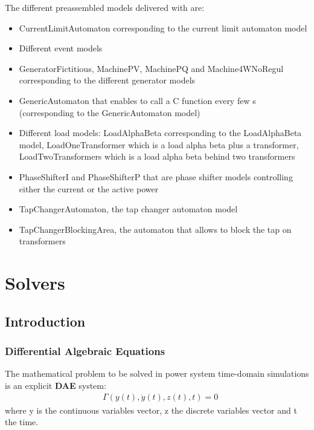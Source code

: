 \documentclass[a4paper, 12pt]{report}
\begin{document}
The different preassembled models delivered with \Dynawo are:
\begin{itemize}
\item CurrentLimitAutomaton corresponding to the current limit automaton model
\item Different event models
\item GeneratorFictitious, MachinePV, MachinePQ and Machine4WNoRegul corresponding to the different generator models
\item GenericAutomaton that enables to call a C function every few s (corresponding to the GenericAutomaton model)
\item Different load models: LoadAlphaBeta corresponding to the LoadAlphaBeta model, LoadOneTransformer which is a load alpha beta plus a transformer, LoadTwoTransformers which is a load alpha beta behind two transformers
\item PhaseShifterI and PhaseShifterP that are phase shifter models controlling either the current or the active power
\item TapChangerAutomaton, the tap changer automaton model
\item TapChangerBlockingArea, the automaton that allows to block the tap on transformers
\end{itemize}

\section{Solvers}

\subsection{Introduction}
\label{sec:Solver Introduction}

\subsubsection{Differential Algebraic Equations}

The mathematical problem to be solved in power system time-domain simulations is an explicit \textbf{\ac{DAE}} system:\\
\begin{equation}
\begin{aligned}
& \Gamma(y(t), \dot{y}(t), z(t), t) = 0
\end{aligned}
\label{DAE}
\end{equation}
where y is the continuous variables vector, z the discrete variables vector and t the time. \\
\end{document}
